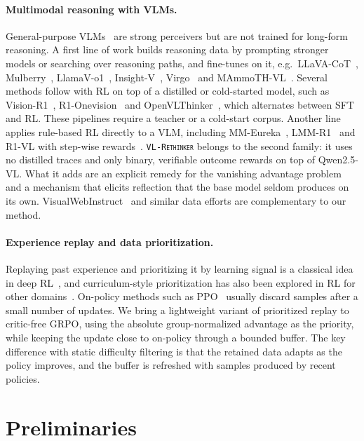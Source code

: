\documentclass{article}
\newcommand{\model}{\texttt{\textsc{VL-Rethinker}}\xspace}
\begin{document}
\paragraph{Multimodal reasoning with VLMs.}
General-purpose VLMs~\citep{qwen2_5_vl,qwen2vl,internvl_2_5,llavaov,deepseekvl2} are strong perceivers but are not trained for long-form reasoning. A first line of work builds reasoning data by prompting stronger models or searching over reasoning paths, and fine-tunes on it, e.g.\ LLaVA-CoT~\citep{llavacot}, Mulberry~\citep{Mulberry}, LlamaV-o1~\citep{llamav_o1}, Insight-V~\citep{insight_v}, Virgo~\citep{virgo} and MAmmoTH-VL~\citep{mammothvl}. Several methods follow with RL on top of a distilled or cold-started model, such as Vision-R1~\citep{vision-r1}, R1-Onevision~\citep{R1OneVision} and OpenVLThinker~\citep{OpenVLThinker}, which alternates between SFT and RL. These pipelines require a teacher or a cold-start corpus. Another line applies rule-based RL directly to a VLM, including MM-Eureka~\citep{mmeureka}, LMM-R1~\citep{lmm-r1} and R1-VL with step-wise rewards~\citep{r1vl}. \model belongs to the second family: it uses no distilled traces and only binary, verifiable outcome rewards on top of Qwen2.5-VL. What it adds are an explicit remedy for the vanishing advantage problem and a mechanism that elicits reflection that the base model seldom produces on its own. VisualWebInstruct~\citep{visualwebinstruct} and similar data efforts are complementary to our method.

\paragraph{Experience replay and data prioritization.}
Replaying past experience and prioritizing it by learning signal is a classical idea in deep RL~\citep{per}, and curriculum-style prioritization has also been explored in RL for other domains~\citep{curriculum}. On-policy methods such as PPO~\citep{ppo} usually discard samples after a small number of updates. We bring a lightweight variant of prioritized replay to critic-free GRPO, using the absolute group-normalized advantage as the priority, while keeping the update close to on-policy through a bounded buffer. The key difference with static difficulty filtering is that the retained data adapts as the policy improves, and the buffer is refreshed with samples produced by recent policies.

\section{Preliminaries}
\end{document}
